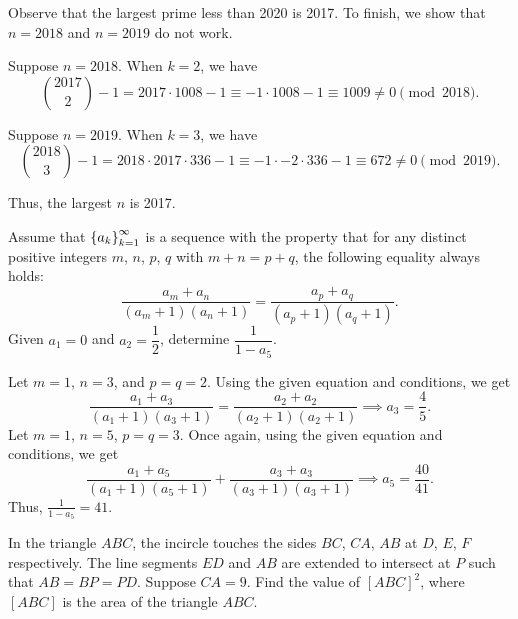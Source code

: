 Observe that the largest prime less than 2020 is 2017. To finish, we show that $n = 2018$ and $n = 2019$ do not work.

 Suppose $n = 2018$. When $k = 2$, we have \[\binom{2017}{2} - 1 = 2017 \cdot 1008 - 1 \equiv -1 \cdot 1008 - 1 \equiv 1009 \neq 0 \pmod{2018}.\]

 Suppose $n = 2019$. When $k = 3$, we have \[\binom{2018}{3} - 1 = 2018 \cdot 2017 \cdot 336 - 1 \equiv -1 \cdot -2 \cdot 336 - 1 \equiv 672 \neq 0 \pmod{2019}.\]

Thus, the largest $n$ is 2017.

\begin{question}[41]\label{A::2020-O-1-19}
    Assume that $\left\lbrace a_k \right\rbrace_{k=1}^\infty$ is a sequence with the property that for any distinct positive integers $m$, $n$, $p$, $q$ with $m + n = p + q$, the following equality always holds: \[\frac{a_m + a_n}{(a_m + 1)(a_n + 1)} = \frac{a_p + a_q}{(a_p + 1)(a_q + 1)}.\] Given $a_1 = 0$ and $a_2 = \dfrac12$, determine $\dfrac1{1 - a_5}$.
\end{question}

Let $m = 1$, $n = 3$, and $p = q = 2$. Using the given equation and conditions, we get \[\frac{a_1 + a_3}{(a_1 + 1)(a_3 + 1)} = \frac{a_2 + a_2}{(a_2 + 1)(a_2 + 1)} \implies a_3 = \frac45.\] Let $m = 1$, $n = 5$, $p = q = 3$. Once again, using the given equation and conditions, we get \[\frac{a_1 + a_5}{(a_1 + 1)(a_5 + 1)} + \frac{a_3 + a_3}{(a_3 + 1)(a_3 + 1)} \implies a_5 = \frac{40}{41}.\] Thus, $\frac{1}{1 - a_5} = 41$.

\begin{question}[140]\label{A::2020-O-1-20}
    In the triangle $ABC$, the incircle touches the sides $BC$, $CA$, $AB$ at $D$, $E$, $F$ respectively. The line segments $ED$ and $AB$ are extended to intersect at $P$ such that $AB = BP = PD$. Suppose $CA = 9$. Find the value of $[ABC]^2$, where $[ABC]$ is the area of the triangle $ABC$.
\end{question}

